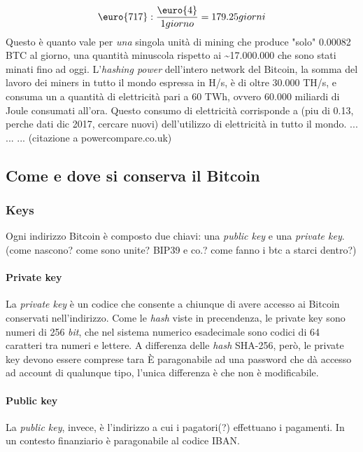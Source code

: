 \documentclass {article}
\begin{document}
$$\textup{\euro{717}} : \frac{\textup{\euro{4}}}{1 giorno} = 179.25 giorni$$
%
Questo è quanto vale per \emph{una} singola unità di mining che produce "solo" 0.00082 BTC al giorno, una quantità minuscola rispetto ai \textasciitilde 17.000.000 che sono stati minati fino ad oggi.
L'\textit{hashing power} dell'intero network del Bitcoin, la somma del lavoro dei miners in tutto il mondo espressa in H/s, è di oltre 30.000 TH/s, e consuma un a quantità di elettricità pari a 60 TWh, ovvero 60.000 miliardi di Joule consumati all'ora.
Questo consumo di elettricità corrisponde a (piu di 0.13, perche dati dic 2017, cercare nuovi) dell'utilizzo di elettricità in tutto il mondo.
... ... ... (citazione a powercompare.co.uk)


\subsection {Come e dove si conserva il Bitcoin}


\subsubsection {Keys}


Ogni indirizzo Bitcoin è composto due chiavi: una \textit{public key} e una \textit{private key}. (come nascono? come sono unite? BIP39 e co.? come fanno i btc a starci dentro?)


\paragraph {Private key}


La \textit{private key} è un codice che consente a chiunque di avere accesso ai Bitcoin conservati nell'indirizzo.
Come le \textit{hash} viste in precendenza, le private key sono numeri di 256 \textit{bit}, che nel sistema numerico esadecimale sono codici di 64 caratteri tra numeri e lettere.
A differenza delle \textit{hash} SHA-256, però, le private key devono essere comprese tara 
È paragonabile ad una password che dà accesso ad account di qualunque tipo, l'unica differenza è che non è modificabile.


\paragraph {Public key}


La \textit{public key}, invece, è l'indirizzo a cui i pagatori(?) effettuano i pagamenti.
In un contesto finanziario è paragonabile al codice IBAN.
\end{document}
